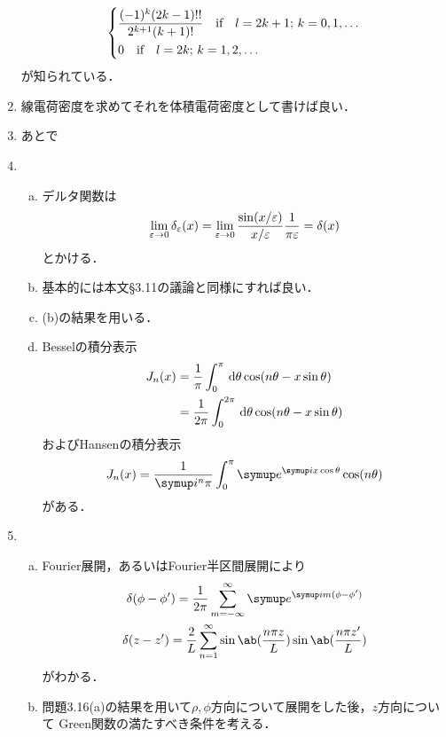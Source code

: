 \begin{enumerate}[label={\large 3.\arabic*}]
\begin{gather}
\begin{dcases}
        \frac{(-1)^k(2k-1)!!}{2^{k+1} (k+1)!} \hspace{1em}\text{if}\hspace{1em} l = 2k+1;\, k=0,1,\ldots\\
        0 \hspace{1em}\text{if}\hspace{1em}l = 2k;\, k = 1, 2, \ldots
      \end{dcases}
    \end{gather}
    が知られている．
  \item 線電荷密度を求めてそれを体積電荷密度として書けば良い．
  \item あとで
  \item 
    \begin{enumerate}[(a)]%
      \item  デルタ関数は
        \begin{gather}%
          \lim_{\eps\to 0} \delta_\eps(x) = \lim_{\eps \to 0} \frac{\sin(x/\eps)}{x/\eps} \frac{1}{\pi \eps} = \delta(x)
        \end{gather}%
        とかける．
      \item 基本的には本文\S 3.11の議論と同様にすれば良い．
      \item (b)の結果を用いる．
      \item Besselの積分表示
        \begin{align}%
          J_n(x) &= \frac{1}{\pi} \int_0^\pi \dl{\theta} \cos(n\theta -x\sin\theta)\\
          &= \frac{1}{2\pi}\int_0^{2\pi}\dl{\theta}\cos(n \theta - x \sin\theta)
        \end{align}%
        およびHansenの積分表示
        \begin{gather}%
          J_n(x) = \frac{1}{\i^n\pi}  \int_0^\pi \e^{\i x\cos\theta}\cos(n \theta)
        \end{gather}%
        がある．
    \end{enumerate}%
  \item 
    \begin{enumerate}[(a)]%
      \item  
        Fourier展開，あるいはFourier半区間展開により
        \begin{gather}%
          \delta(\phi - \phi ') =
          \frac{1}{2\pi} \sum_{m=-\infty}^\infty \e^{\i m(\phi - \phi')}\\
          \delta(z- z') = 
          \frac{2}{L} \sum_{n=1}^\infty\sin\ab(\frac{n\pi z}{L})\sin\ab(\frac{n\pi z'}{L})
        \end{gather}%
        がわかる．
      \item 問題3.16(a)の結果を用いて$\rho, \phi$方向について展開をした後，$z$方向について
        Green関数の満たすべき条件を考える．

\end{enumerate}
\end{enumerate}
